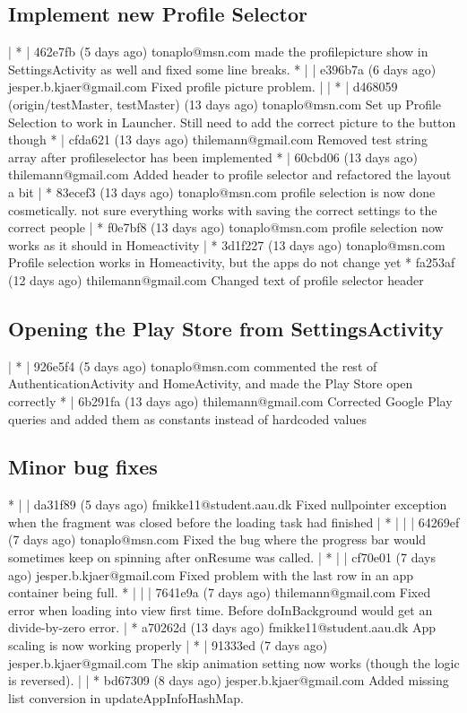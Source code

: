 \subsection{Implement new Profile Selector}
| * | 462e7fb (5 days ago) tonaplo@msn.com made the profilepicture show in SettingsActivity as well and fixed some line breaks.
* | | e396b7a (6 days ago) jesper.b.kjaer@gmail.com Fixed profile picture problem.
| | * | d468059 (origin/testMaster, testMaster) (13 days ago) tonaplo@msn.com Set up Profile Selection to work in Launcher. Still need to add the correct picture to the button though
* | cfda621 (13 days ago) thilemann@gmail.com Removed test string array after profileselector has been implemented
* | 60cbd06 (13 days ago) thilemann@gmail.com Added header to profile selector and refactored the layout a bit
| * 83ecef3 (13 days ago) tonaplo@msn.com profile selection is now done cosmetically. not sure everything works with saving the correct settings to the correct people
| * f0e7bf8 (13 days ago) tonaplo@msn.com profile selection now works as it should in Homeactivity
| * 3d1f227 (13 days ago) tonaplo@msn.com Profile selection works in Homeactivity, but the apps do not change yet
* fa253af (12 days ago) thilemann@gmail.com Changed text of profile selector header

\subsection{Opening the Play Store from SettingsActivity}
| * | 926e5f4 (5 days ago) tonaplo@msn.com commented the rest of AuthenticationActivity and HomeActivity, and made the Play Store open correctly
* | 6b291fa (13 days ago) thilemann@gmail.com Corrected Google Play queries and added them as constants instead of hardcoded values

\subsection{Minor bug fixes}
* | | da31f89 (5 days ago) fmikke11@student.aau.dk Fixed nullpointer exception when the fragment was closed before the loading task had finished
| * | | | 64269ef (7 days ago) tonaplo@msn.com Fixed the bug where the progress bar would sometimes keep on spinning after onResume was called.
| * | | cf70e01 (7 days ago) jesper.b.kjaer@gmail.com Fixed problem with the last row in an app container being full.
* | | | 7641e9a (7 days ago) thilemann@gmail.com Fixed error when loading into view first time. Before doInBackground would get an divide-by-zero error.
| * a70262d (13 days ago) fmikke11@student.aau.dk App scaling is now working properly
| * | 91333ed (7 days ago) jesper.b.kjaer@gmail.com The skip animation setting now works (though the logic is reversed).
| | * bd67309 (8 days ago) jesper.b.kjaer@gmail.com Added missing list conversion in updateAppInfoHashMap.

